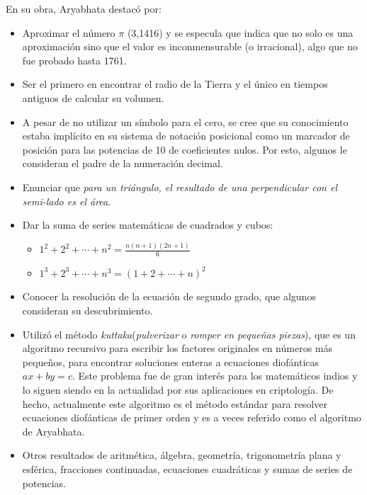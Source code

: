 \documentclass[a4paper, 11pt]{article}
\begin{document}
		En su obra, Aryabhata destacó por:
		\begin{itemize}
			\item Aproximar el número $\pi$ (3,1416) y se especula que indica que no solo es una aproximación sino
			que el valor es inconmensurable (o irracional), algo que no fue probado hasta 1761.
			\item Ser el primero en encontrar el radio de la Tierra y el único en tiempos antiguos de calcular su
			volumen.
			\item A pesar de no utilizar un símbolo para el cero, se cree que su conocimiento estaba implícito en su
			sistema de notación posicional como un marcador de posición para las potencias de 10 de coeficientes nulos.
			Por esto, algunos le consideran el padre de la numeración decimal.					
			\item Enunciar que \textit{para un triángulo, el resultado de una perpendicular con el semi-lado es el área}.
			\item Dar la suma de series matemáticas de cuadrados y cubos:
			\begin{itemize}
				\item $\displaystyle 1^2 + 2^2 + \cdots + n^2 = \frac{n(n + 1)(2n + 1)}{6}$
				\item $\displaystyle 1^{3} + 2^{3} + \cdots + n^{3} = (1+2+\cdots +n)^{2}$ 
			\end{itemize}
			\item Conocer la resolución de la ecuación de segundo grado, que algunos consideran su descubrimiento.
			\item Utilizó el método \textit{kuttaka}(\textit{pulverizar} o \textit{romper en pequeñas piezas}), que es
			un algoritmo recursivo para escribir los factores originales en números más pequeños, para encontrar
			soluciones enteras a ecuaciones diofánticas $ax + by = c$. Este problema fue de gran interés para los
			matemáticos indios y lo siguen siendo en la actualidad por sus aplicaciones en criptología. De hecho,
			actualmente este algoritmo es el método estándar para resolver ecuaciones diofánticas de primer orden y es
			a veces referido como el algoritmo de Aryabhata.
			\item Otros resultados de aritmética, álgebra, geometría, trigonometría plana y esférica, fracciones
			continuadas, ecuaciones cuadráticas y sumas de series de potencias.
		\end{itemize} 		
\end{document}
